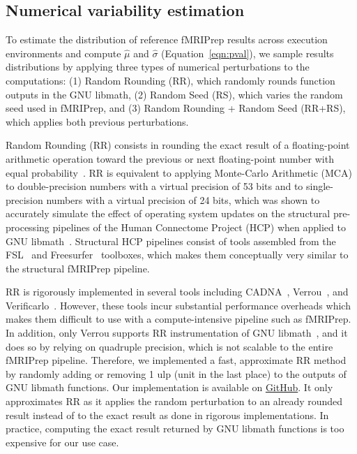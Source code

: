 \documentclass{article}
\begin{document}
\subsection{Numerical variability estimation}

To estimate the distribution of reference fMRIPrep results across execution
environments and compute $\hat \mu$ and $\hat \sigma$ (Equation~\ref{eqn:pval}), we
sample results distributions by applying three types of numerical perturbations
to the computations: (1) Random Rounding (RR), which randomly rounds function
outputs in the GNU libmath, (2) Random Seed (RS), which varies the random seed
used in fMRIPrep, and (3) Random Rounding + Random Seed (RR+RS), which applies
both previous perturbations.

Random Rounding (RR) consists in rounding the exact result of a floating-point
arithmetic operation toward the previous or next floating-point number with
equal probability~\cite{forsythe1959reprint}. RR is equivalent to applying
Monte-Carlo Arithmetic (MCA) to double-precision numbers with a virtual
precision of 53 bits and to single-precision numbers with a virtual precision of
24 bits, which was shown to accurately simulate the effect of operating system
updates on the structural pre-processing pipelines of the Human Connectome
Project (HCP) when applied to GNU libmath~\cite{salari2021accurate}. Structural
HCP pipelines consist of tools assembled from the FSL~\cite{jenkinson2012fsl}
and Freesurfer~\cite{fischl2012freesurfer} toolboxes, which makes them
conceptually very similar to the structural fMRIPrep pipeline.

RR is rigorously implemented in several tools including
CADNA~\cite{jezequel2008cadna}, Verrou~\cite{fevotte2016verrou}, and
Verificarlo~\cite{denis2016verificarlo}. However, these tools incur substantial
performance overheads which makes them difficult to use with a compute-intensive
pipeline such as fMRIPrep. In addition, only Verrou supports RR instrumentation
of GNU libmath~\cite{fevotte2019debugging}, and it does so by relying on
quadruple precision, which is not scalable to the entire fMRIPrep pipeline.
Therefore, we implemented a fast, approximate RR method by randomly adding or
removing 1 ulp (unit in the last place) to the outputs of GNU libmath functions.
Our implementation is available on \href{https://github.com/verificarlo/fuzzy}{GitHub}.
It only
approximates RR as it applies the random perturbation to an already rounded
result instead of to the exact result as done in rigorous implementations. In
practice, computing the exact result returned by GNU libmath functions is too
expensive for our use case.
\end{document}
